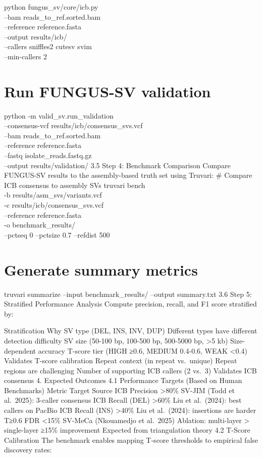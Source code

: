 \documentclass[
]{article}
\begin{document}
python fungus\_sv/core/icb.py\\
--bam reads\_to\_ref.sorted.bam\\
--reference reference.fasta\\
--output results/icb/\\
--callers sniffles2 cutesv svim\\
--min-callers 2

\hypertarget{run-fungus-sv-validation}{%
\section{Run FUNGUS-SV validation}\label{run-fungus-sv-validation}}

python -m valid\_sv.run\_validation\\
--consensus-vcf results/icb/consensus\_svs.vcf\\
--bam reads\_to\_ref.sorted.bam\\
--reference reference.fasta\\
--fastq isolate\_reads.fastq.gz\\
--output results/validation/ 3.5 Step 4: Benchmark Comparison Compare
FUNGUS-SV results to the assembly-based truth set using Truvari: \#
Compare ICB consensus to assembly SVs truvari bench\\
-b results/asm\_svs/variants.vcf\\
-c results/icb/consensus\_svs.vcf\\
--reference reference.fasta\\
-o benchmark\_results/\\
--pctseq 0 --pctsize 0.7 --refdist 500

\hypertarget{generate-summary-metrics}{%
\section{Generate summary metrics}\label{generate-summary-metrics}}

truvari summarize --input benchmark\_results/ --output summary.txt 3.6
Step 5: Stratified Performance Analysis Compute precision, recall, and
F1 score stratified by:

Stratification Why SV type (DEL, INS, INV, DUP) Different types have
different detection difficulty SV size (50-100 bp, 100-500 bp, 500-5000
bp, \textgreater5 kb) Size-dependent accuracy T-score tier (HIGH ≥0.6,
MEDIUM 0.4-0.6, WEAK \textless0.4) Validates T-score calibration Repeat
context (in repeat vs.~unique) Repeat regions are challenging Number of
supporting ICB callers (2 vs.~3) Validates ICB consensus 4. Expected
Outcomes 4.1 Performance Targets (Based on Human Benchmarks) Metric
Target Source ICB Precision \textgreater80\% SV-JIM (Todd et al.~2025):
3-caller consensus ICB Recall (DEL) \textgreater60\% Liu et al.~(2024):
best callers on PacBio ICB Recall (INS) \textgreater40\% Liu et
al.~(2024): insertions are harder T≥0.6 FDR \textless15\% SV-MeCa
(Nkouamedjo et al.~2025) Ablation: multi-layer \textgreater{}
single-layer ≥15\% improvement Expected from triangulation theory 4.2
T-Score Calibration The benchmark enables mapping T-score thresholds to
empirical false discovery rates:
\end{document}
